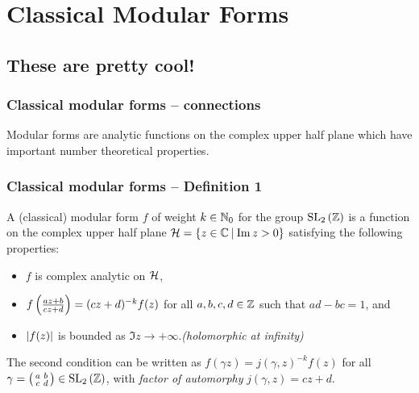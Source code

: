 \section{Classical Modular Forms}


\subsection{These are pretty cool!}

\begin{frame} \frametitle{Classical modular forms -- connections}
  Modular forms are analytic functions on the complex upper half plane which have important number theoretical properties. %
\end{frame}


\begin{frame} \frametitle{Classical modular forms -- Definition 1} \pause
  \begin{definition}
    A (classical) modular form $f$ of weight $k \in \NNO$ for the group $\SL[2]{\ZZ}$ is a function on the complex upper half plane $\HH = \setst{z \in \CC}{\Im{z} > 0}$ satisfying the following properties: \pause
    \begin{itemize}
      \item $f$ is complex analytic on $\HH$\pause,
      \item $f\parens{\frac{az+b}{cz+d}} = (cz+d)^{-k} f(z)$ for all $a,b,c,d \in \ZZ$ such that $ad-bc = 1$\pause, and
      \item $\abs{f(z)}$ is bounded as $\Im{z} \to +\infty$.\pause \hfill \emph{(holomorphic at infinity)}
    \end{itemize}
  \end{definition}

  The second condition can be written as $f(\gamma z) = j(\gamma,z)^{-k} f(z)$ for all $\gamma = \parens{\begin{smallmatrix} a & b \\ c & d \end{smallmatrix}} \in \SL[2]{\ZZ}$, with \emph{factor of automorphy} $j(\gamma,z) = cz+d$.
\end{frame}


